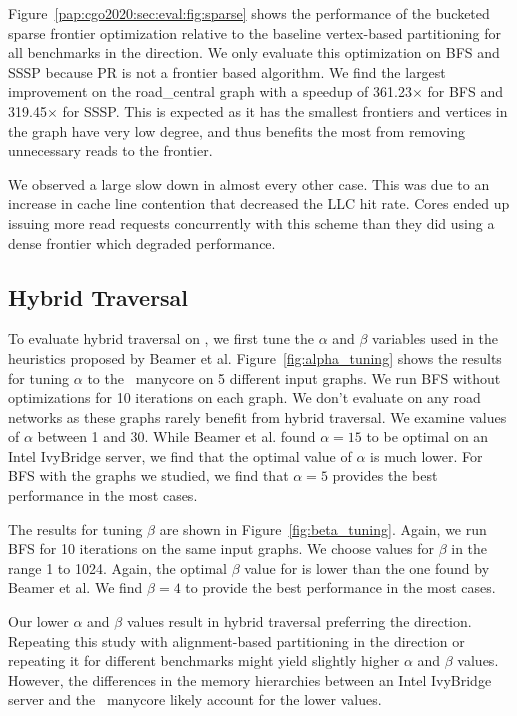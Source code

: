 Figure~\ref{pap:cgo2020:sec:eval:fig:sparse} shows the performance of the bucketed sparse frontier optimization relative to the baseline vertex-based partitioning for all benchmarks in the \push direction.
We only evaluate this optimization on BFS and SSSP because PR is not a frontier based algorithm.
We find the largest improvement on the road\_central graph with a speedup of 361.23$\times$ for BFS and 319.45$\times$ for SSSP.
This is expected as it has the smallest frontiers and vertices in the graph have very low degree, and thus benefits the most from removing unnecessary reads to the frontier.

We observed a large slow down in almost every other case.
This was due to an increase in cache line contention that decreased the LLC hit rate. 
Cores ended up issuing more read requests concurrently with this scheme than they did using a dense frontier which degraded performance.

\subsection{Hybrid Traversal}
\alphatune
\betatune
To evaluate hybrid traversal on \hb, we first tune the $\alpha$ and $\beta$ variables used in the heuristics proposed by Beamer et al.
Figure~\ref{fig:alpha_tuning} shows the results for tuning $\alpha$ to the \hb~manycore on 5 different input graphs. 
We run BFS without optimizations for 10 iterations on each graph.
We don't evaluate on any road networks as these graphs rarely benefit from hybrid traversal.
We examine values of $\alpha$ between 1 and 30.
While Beamer et al. found $\alpha=15$ to be optimal on an Intel IvyBridge server, we find that the optimal value of $\alpha$ is much lower.
For BFS with the graphs we studied, we find that $\alpha=5$ provides the best performance in the most cases.

The results for tuning $\beta$ are shown in Figure~\ref{fig:beta_tuning}.
Again, we run BFS for 10 iterations on the same input graphs.
We choose values for $\beta$ in the range 1 to 1024.
Again, the optimal $\beta$ value for \hb is lower than the one found by Beamer et al.
We find $\beta=4$ to provide the best performance in the most cases.

Our lower $\alpha$ and $\beta$ values result in hybrid traversal preferring the \push direction.
Repeating this study with alignment-based partitioning in the \pull direction or repeating it for different benchmarks might yield slightly higher $\alpha$ and $\beta$ values.
However, the differences in the memory hierarchies between an Intel IvyBridge server and the \hb~manycore likely account for the lower values.

